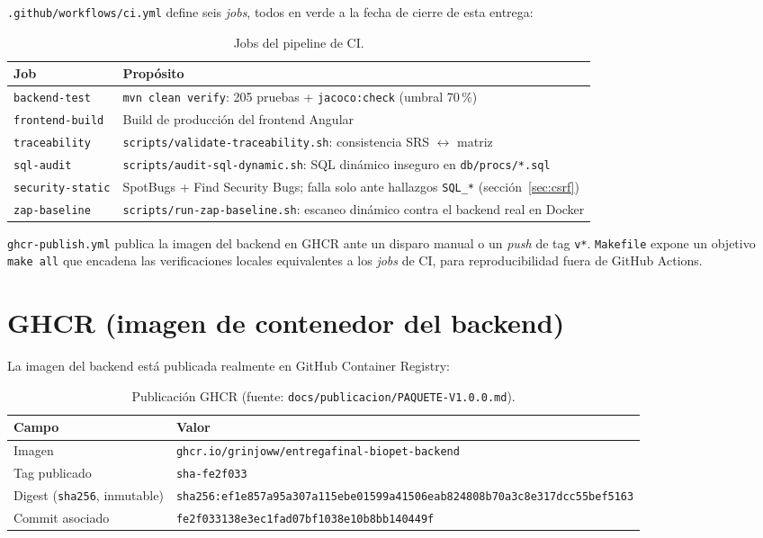 \texttt{.github/workflows/ci.yml} define seis \emph{jobs}, todos en verde a
la fecha de cierre de esta entrega:

\begin{table}[H]
  \centering
  \small
  \caption{Jobs del pipeline de CI.}
  \label{tab:ci-jobs}
  \begin{tabular}{@{}p{2.8cm}p{9.4cm}@{}}
    \toprule
    Job & Prop\'osito \\
    \midrule
    \texttt{backend-test} & \texttt{mvn clean verify}: 205 pruebas + \texttt{jacoco:check} (umbral 70\,\%) \\
    \texttt{frontend-build} & Build de producci\'on del frontend Angular \\
    \texttt{traceability} & \texttt{scripts/validate-traceability.sh}: consistencia SRS $\leftrightarrow$ matriz \\
    \texttt{sql-audit} & \texttt{scripts/audit-sql-dynamic.sh}: SQL din\'amico inseguro en \texttt{db/procs/*.sql} \\
    \texttt{security-static} & SpotBugs + Find Security Bugs; falla solo ante hallazgos \texttt{SQL\_*} (secci\'on~\ref{sec:csrf}) \\
    \texttt{zap-baseline} & \texttt{scripts/run-zap-baseline.sh}: escaneo din\'amico contra el backend real en Docker \\
    \bottomrule
  \end{tabular}
\end{table}

\texttt{ghcr-publish.yml} publica la imagen del backend en GHCR ante un
disparo manual o un \emph{push} de tag \texttt{v*}. \texttt{Makefile}
expone un objetivo \texttt{make all} que encadena las verificaciones
locales equivalentes a los \emph{jobs} de CI, para reproducibilidad fuera
de GitHub Actions.

\section{GHCR (imagen de contenedor del backend)}

La imagen del backend est\'a publicada realmente en GitHub Container
Registry:

\begin{table}[H]
  \centering
  \caption{Publicaci\'on GHCR (fuente: \texttt{docs/publicacion/PAQUETE-V1.0.0.md}).}
  \label{tab:ghcr-final}
  \begin{tabular}{@{}ll@{}}
    \toprule
    Campo & Valor \\
    \midrule
    Imagen & \texttt{ghcr.io/grinjoww/entregafinal-biopet-backend} \\
    Tag publicado & \texttt{sha-fe2f033} \\
    Digest (\texttt{sha256}, inmutable) & \texttt{sha256:ef1e857a95a307a1\allowbreak15ebe01599a41506eab824808b70a3c8e317dcc55bef5163} \\
    Commit asociado & \texttt{fe2f033138e3ec1fad07bf1038e10b8bb140449f} \\
    \bottomrule
  \end{tabular}
\end{table}

